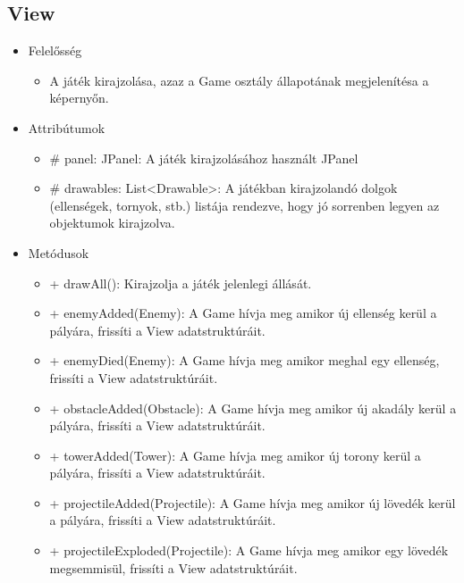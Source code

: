 \subsection{View}
\begin{itemize}
\item Felelősség
\begin{itemize}
	\item A játék kirajzolása, azaz a Game osztály állapotának megjelenítésa a képernyőn.
\end{itemize}
\item Attribútumok
	\begin{itemize}
		\item \# panel: JPanel: A játék kirajzolásához használt JPanel
		\item \# drawables: List<Drawable>: A játékban kirajzolandó dolgok (ellenségek, tornyok, stb.) listája rendezve, hogy jó sorrenben legyen az objektumok kirajzolva.
	\end{itemize}
\item Metódusok
	\begin{itemize}
		\item + drawAll(): Kirajzolja a játék jelenlegi állását.
		\item + enemyAdded(Enemy): A Game hívja meg amikor új ellenség kerül a pályára, frissíti a View adatstruktúráit.
		\item + enemyDied(Enemy): A Game hívja meg amikor meghal egy ellenség, frissíti a View adatstruktúráit.
		\item + obstacleAdded(Obstacle): A Game hívja meg amikor új akadály kerül a pályára, frissíti a View adatstruktúráit.
		\item + towerAdded(Tower): A Game hívja meg amikor új torony kerül a pályára, frissíti a View adatstruktúráit.
		\item + projectileAdded(Projectile): A Game hívja meg amikor új lövedék kerül a pályára, frissíti a View adatstruktúráit.
		\item + projectileExploded(Projectile): A Game hívja meg amikor egy lövedék megsemmisül, frissíti a View adatstruktúráit.
	\end{itemize}
\end{itemize}

